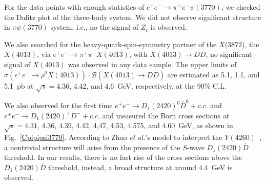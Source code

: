 \documentclass[aps,preprint,superscriptaddress,12pt,tightenlines]{revtex4}
\newcommand{\pspp}{\psi(3770)}
\newcommand{\EE}{e^+e^-}
\newcommand{\pp}{\pi^+\pi^-}
\newcommand{\ddb}{D\bar{D}}
\begin{document}
For the data points with enough statistics of $\EE\to \pp\pspp$,
we checked the Dalitz plot of the three-body system. We did not
observe significant structure in $\pi\pspp$ system, i.e., no the
signal of $Z_c$ is observed.

We also searched for the heavy-quark-spin-symmetry partner of the
$X(3872$), the $X(4013)$, via $e^{+}e^{-}\to
\pi^{+}\pi^{-}X(4013)$, with $X(4013)\to D\bar{D}$, no significant
signal of $X(4013)$ was observed in any data sample. The upper
limits of $\sigma(\EE\to \rho^{0}X(4013))\cdot
\mathcal{B}(X(4013)\to \ddb)$ are estimated as 5.1, 1.1, and
5.1~pb at $\sqrt{s}=4.36$, 4.42, and 4.6~GeV, respectively, at the
90\% C.L.

We also observed for the first time $e^{+}e^{-}\to
D_{1}(2420)^{0}\bar{D}^{0}+c.c.$ and $e^{+}e^{-}\to
D_{1}(2420)^{+}D^{-}+c.c.$ and measured the Born cross sections at
$\sqrt{s} = 4.31$, 4.36, 4.39, 4.42, 4,47, 4.53, 4.575, and
4.60~GeV, as shown in Fig.~\ref{Cpipipsi3770}. According to Zhao
{\it et al.}'s model to interpret the $Y(4260)$~\cite{Y4260asDD1},
a nontrivial structure will arise from the presence of the
$S$-wave $D_{1}(2420)\bar{D}$ threshold. In our results, there is no
fast rise of the cross sections above the $D_{1}(2420)\bar{D}$
threshold, instead, a broad structure at around 4.4~GeV is
observed.
\end{document}
